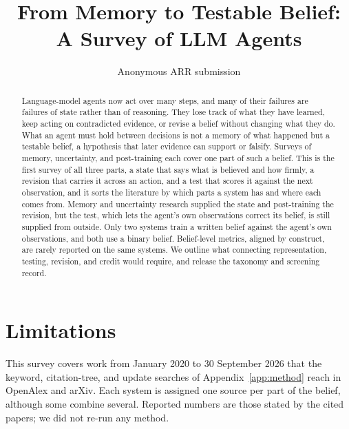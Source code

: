 \documentclass[11pt]{article}
\title{From Memory to Testable Belief: A Survey of LLM Agents}
\author{Anonymous ARR submission}
\begin{document}
\maketitle

\begin{abstract}
Language-model agents now act over many steps, and many of their failures are failures of state rather than of reasoning. They lose track of what they have learned, keep acting on contradicted evidence, or revise a belief without changing what they do. What an agent must hold between decisions is not a memory of what happened but a testable belief, a hypothesis that later evidence can support or falsify. Surveys of memory, uncertainty, and post-training each cover one part of such a belief. This is the first survey of all three parts, a state that says what is believed and how firmly, a revision that carries it across an action, and a test that scores it against the next observation, and it sorts the literature by which parts a system has and where each comes from. Memory and uncertainty research supplied the state and post-training the revision, but the test, which lets the agent's own observations correct its belief, is still supplied from outside. Only two systems train a written belief against the agent's own observations, and both use a binary belief. Belief-level metrics, aligned by construct, are rarely reported on the same systems. We outline what connecting representation, testing, revision, and credit would require, and release the taxonomy and screening record.
\end{abstract}













\section*{Limitations}
This survey covers work from January 2020 to 30 September 2026 that the keyword, citation-tree, and update searches of Appendix~\ref{app:method} reach in OpenAlex and arXiv. Each system is assigned one source per part of the belief, although some combine several. Reported numbers are those stated by the cited papers; we did not re-run any method.



\appendix




\end{document}
